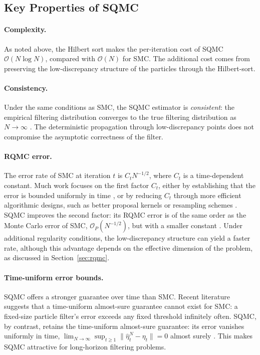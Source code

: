 
\subsection{Key Properties of SQMC}
\label{sec:sqmc-properties}

\paragraph{Complexity.}
As noted above, the Hilbert sort makes the per-iteration cost of SQMC $\mathcal{O}(N \log N)$, compared with $\mathcal{O}(N)$ for SMC. The additional cost comes from preserving the low-discrepancy structure of the particles through the Hilbert-sort.

\paragraph{Consistency.}
Under the same conditions as SMC, the SQMC estimator is \textit{consistent}: the empirical filtering distribution converges to the true filtering distribution as $N \to \infty$ \citep{chopingerber2015sqmc}. The deterministic propagation through low-discrepancy points does not compromise the asymptotic correctness of the filter.

\paragraph{RQMC error.}
The error rate of SMC at iteration $t$ is $C_t N^{-1/2}$, where $C_t$ is a time-dependent constant. Much work focuses on the first factor $C_t$, either by establishing that the error is bounded uniformly in time \citep{delmoral2004feynman,whiteley2013stability}, or by reducing $C_t$ through more efficient algorithmic designs, such as better proposal kernels or resampling schemes \citep{delmoraldoucetjasra2012smcsamplers}. SQMC improves the second factor: its RQMC error is of the same order as the Monte Carlo error of SMC, $\mathcal{O}_P(N^{-1/2})$, but with a smaller constant \citep{chopingerber2015sqmc}. Under additional regularity conditions, the low-discrepancy structure can yield a faster rate, although this advantage depends on the effective dimension of the problem, as discussed in Section~\ref{sec:rqmc}.

\paragraph{Time-uniform error bounds.}
SQMC offers a stronger guarantee over time than SMC. Recent literature suggests that a time-uniform almost-sure guarantee cannot exist for SMC: a fixed-size particle filter's error exceeds any fixed threshold infinitely often. SQMC, by contrast, retains the time-uniform almost-sure guarantee: its error vanishes uniformly in time, $\lim_{N\to\infty}\sup_{t\ge 1}\|\hat\eta_t^N - \eta_t\| = 0$ almost surely \citep{gerber2026}. This makes SQMC attractive for long-horizon filtering problems.

